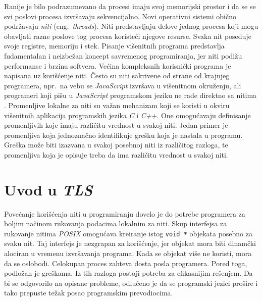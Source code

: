 \documentclass[12pt,oneside]{memoir}
\begin{document}
Ranije je bilo podrazumevano da procesi imaju svoj memorijski prostor i da se se svi poslovi procesa izvršavaju sekvencijalno. Novi operativni sistemi obično podržavaju \emph{niti} (eng.~\emph{threads}). Niti predstavljaju delove jednog procesa koji mogu obavljati razne poslove tog procesa koristeći njegove resurse. Svaka nit poseduje svoje registre, memoriju i stek. Pisanje višenitnih programa predstavlja fudamentalan i neizbežan koncept savremenog programiranja, jer niti podižu performanse i brzinu softvera. Većina kompleksnih korisnički programa je napisana uz korišćenje niti. Često su niti sakrivene od strane od krajnjeg programera, npr.~na vebu se \emph{JavaScript} izvršava u višenitnom okruženju, ali programeri koji pišu u \emph{JavaScript} programskom jeziku ne rade direktno sa nitima \cite{JavaScript}. Promenljive lokalne za niti su važan mehanizam koji se koristi u okviru višenitnih aplikacija programskih jezika \emph{C} i \emph{C++}. One omogućavaju definisanje promenljivih koje imaju različitu vrednost u svakoj niti. Jedan primer je promenljiva koja jednoznačno identifikuje grešku koja je nastala u programu. Greška može biti izazvana u svakoj posebnoj niti iz različitog razloga, te promenljiva koja je opisuje treba da ima različitu vrednost u svakoj niti.

\section{Uvod u \emph{TLS}}

Povećanje korišćenja niti u programiranju dovelo je do potrebe programera za boljim načinom rukovanja podacima lokalnim za niti. Skup interfejsa za rukovanje nitima \emph{POSIX} \cite{POSIX} omogućava kreiranje istog \texttt{void *} objekata posebno za svaku nit. Taj interfejs je nezgrapan za korišćenje, jer objekat mora biti dinamčki alociran u vremenu izvršavanja programa. Kada se objekat više ne koristi, mora da se oslobodi. Celokupan proces zahteva dosta posla programera. Pored toga, podložan je greškama. Iz tih razloga postoji potreba za efikasnijim rešenjem. Da bi se odgovorilo na opisane probleme, odlučeno je da se programski jezici prošire i tako prepuste težak posao programskim prevodiocima.
\end{document}
